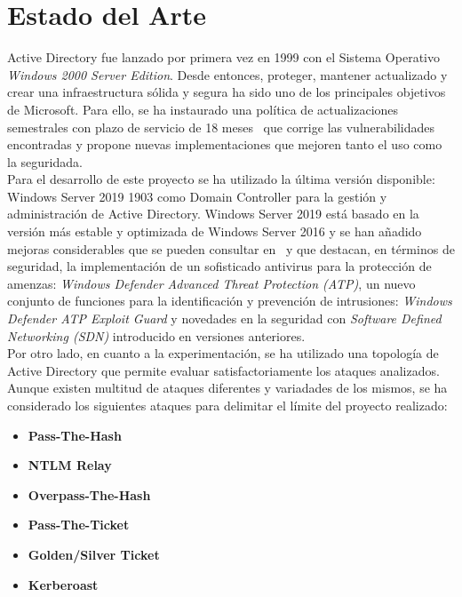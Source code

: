 \section{Estado del Arte}

Active Directory fue lanzado por primera vez en 1999 con el Sistema Operativo {\it Windows 2000 Server Edition}. Desde entonces, proteger, mantener actualizado y crear una infraestructura sólida y segura ha sido uno de los principales objetivos de Microsoft. Para ello, se ha instaurado una política de actualizaciones semestrales con plazo de servicio de 18 meses~\cite{Capitulo1:Update} que corrige las vulnerabilidades encontradas y propone nuevas implementaciones que mejoren tanto el uso como la seguridada.\\

Para el desarrollo de este proyecto se ha utilizado la última versión disponible: Windows Server 2019 1903 como Domain Controller para la gestión y administración de Active Directory. Windows Server 2019 está basado en la versión más estable y optimizada de Windows Server 2016 y se han añadido mejoras considerables que se pueden consultar en~\cite{Capitulo1:WindowsServer2019} y que destacan, en términos de seguridad, la implementación de un sofisticado antivirus para la protección de amenzas: {\it Windows Defender Advanced Threat Protection (ATP)}, un nuevo conjunto de funciones para la identificación y prevención de intrusiones: {\it Windows Defender ATP Exploit Guard} y novedades en la seguridad con {\it Software Defined Networking (SDN)} introducido en versiones anteriores. \\

Por otro lado, en cuanto a la experimentación, se ha utilizado una topología de Active Directory que permite evaluar satisfactoriamente los ataques analizados. Aunque existen multitud de ataques diferentes y variadades de los mismos, se ha considerado los siguientes ataques para delimitar el límite del proyecto realizado: 

\begin{itemize}
\item \textbf{Pass-The-Hash}
\item \textbf{NTLM Relay}
\item \textbf{Overpass-The-Hash}
\item \textbf{Pass-The-Ticket}
\item \textbf{Golden/Silver Ticket}
\item \textbf{Kerberoast}
\end{itemize}

